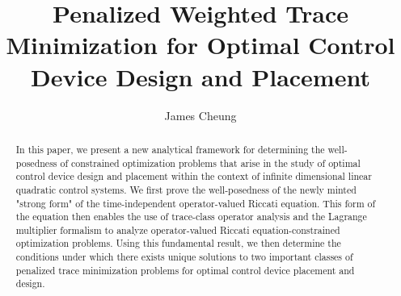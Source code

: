 \documentclass{amsart}
\title{Penalized Weighted Trace Minimization for Optimal Control Device Design and Placement}
\author{James Cheung}
\begin{document}
\maketitle
\begin{abstract}
In this paper, we present a new analytical framework for determining the well-posedness of constrained optimization problems that arise in the study of optimal control device design and placement within the context of infinite dimensional linear quadratic control systems. We first prove the well-posedness of the newly minted "strong form" of the time-independent operator-valued Riccati equation. This form of the equation then enables the use of trace-class operator analysis and the Lagrange multiplier formalism to analyze operator-valued Riccati equation-constrained optimization problems. Using this fundamental result, we then determine the conditions under which there exists unique solutions to two important classes of penalized trace minimization problems for optimal control device placement and design.
\end{abstract}
\end{document}
